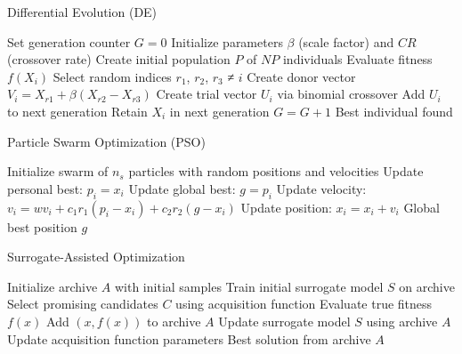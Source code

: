 \documentclass{article}
\begin{document}
\begin{algorithm}
\caption{Differential Evolution (DE)}
\begin{algorithmic}[1]
\State Set generation counter $G = 0$
\State Initialize parameters $\beta$ (scale factor) and $CR$ (crossover rate)
\State Create initial population $P$ of $NP$ individuals
        \State Evaluate fitness $f(X_i)$
        \State Select random indices $r_1$, $r_2$, $r_3$ ≠ $i$
        \State Create donor vector $V_i = X_{r1} + \beta(X_{r2} - X_{r3})$
        \State Create trial vector $U_i$ via binomial crossover
            \State Add $U_i$ to next generation
        \Else
            \State Retain $X_i$ in next generation
        \EndIf
    \EndFor
    \State $G = G + 1$
\EndWhile
\State \Return Best individual found
\end{algorithmic}
\end{algorithm}

\begin{algorithm}
\caption{Particle Swarm Optimization (PSO)}
\begin{algorithmic}[1]
\State Initialize swarm of $n_s$ particles with random positions and velocities
            \State Update personal best: $p_i = x_i$
        \EndIf
            \State Update global best: $g = p_i$
        \EndIf
    \EndFor
        \State Update velocity: $v_i = w v_i + c_1r_1(p_i - x_i) + c_2r_2(g - x_i)$
        \State Update position: $x_i = x_i + v_i$
    \EndFor
\EndWhile
\State \Return Global best position $g$
\end{algorithmic}
\end{algorithm}

\begin{algorithm}
\caption{Surrogate-Assisted Optimization}
\begin{algorithmic}[1]
\State Initialize archive $A$ with initial samples
\State Train initial surrogate model $S$ on archive
    \State Select promising candidates $C$ using acquisition function
        \State Evaluate true fitness $f(x)$
        \State Add $(x, f(x))$ to archive $A$
    \EndFor
    \State Update surrogate model $S$ using archive $A$
    \State Update acquisition function parameters
\EndWhile
\State \Return Best solution from archive $A$
\end{algorithmic}
\end{algorithm}
\end{document}
